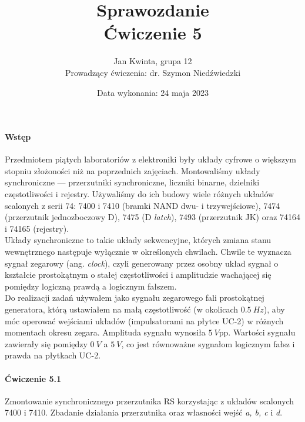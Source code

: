 \documentclass[14pt, table]{extarticle}
\title{\textbf{Sprawozdanie} \\ \Large{Ćwiczenie 5}}
\date{Data wykonania: 24 maja 2023}
\author{ \Large{Jan Kwinta, grupa 12} \\ \large{Prowadzący ćwiczenia: dr. Szymon Niedźwiedzki}}
\begin{document}
\maketitle

\paragraph{Wstęp \\}

Przedmiotem piątych laboratoriów z elektroniki były układy cyfrowe o większym stopniu złożoności niż na poprzednich zajęciach. Montowaliśmy układy synchroniczne — przerzutniki synchroniczne, liczniki binarne,  dzielniki częstotliwości i rejestry. Używaliśmy do ich budowy wiele różnych układów scalonych z serii 74: 7400 i 7410 (bramki NAND dwu-  i trzywejściowe), 7474 (przerzutnik jednozboczowy D), 7475 (D \textit{latch}), 7493  (przerzutnik JK) oraz 74164 i 74165 (rejestry). \\

Układy synchroniczne to takie układy sekwencyjne, których zmiana stanu wewnętrznego następuje wyłącznie w określonych chwilach. Chwile te wyznacza sygnał zegarowy (ang. \textit{clock}), czyli generowany przez osobny układ sygnał o kształcie prostokątnym o stałej częstotliwości i amplitudzie wachającej się pomiędzy logiczną prawdą a logicznym fałszem. \\

Do realizacji zadań używałem jako sygnału zegarowego fali prostokątnej generatora, którą ustawiałem na małą częstotliwość (w okolicach $0.5 \ Hz$), aby móc operować wejściami układów (impulsatorami na płytce UC-2) w różnych momentach okresu zegara. Amplituda sygnału wynosiła $5 \ V$pp. Wartości sygnału zawierały się pomiędzy $0 \ V$ a $5 \ V$, co jest równoważne sygnałom logicznym fałsz i prawda na płytkach UC-2.

\newpage
\paragraph{Ćwiczenie 5.1 \\}
Zmontowanie synchronicznego przerzutnika RS korzystając z układów scalonych 7400 i 7410. Zbadanie działania przerzutnika oraz własności wejść \textit{a, b, c} i \textit{d}.
\end{document}
